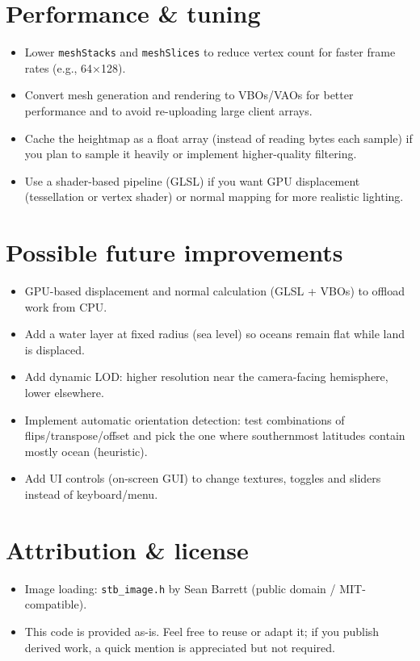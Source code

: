 \documentclass[11pt]{article}
\begin{document}
\section{Performance \& tuning}
\begin{itemize}
  \item Lower \texttt{meshStacks} and \texttt{meshSlices} to reduce vertex count for faster frame rates (e.g., 64×128).
  \item Convert mesh generation and rendering to VBOs/VAOs for better performance and to avoid re-uploading large client arrays.
  \item Cache the heightmap as a float array (instead of reading bytes each sample) if you plan to sample it heavily or implement higher-quality filtering.
  \item Use a shader-based pipeline (GLSL) if you want GPU displacement (tessellation or vertex shader) or normal mapping for more realistic lighting.
\end{itemize}

\section{Possible future improvements}
\begin{itemize}
  \item GPU-based displacement and normal calculation (GLSL + VBOs) to offload work from CPU.
  \item Add a water layer at fixed radius (sea level) so oceans remain flat while land is displaced.
  \item Add dynamic LOD: higher resolution near the camera-facing hemisphere, lower elsewhere.
  \item Implement automatic orientation detection: test combinations of flips/transpose/offset and pick the one where southernmost latitudes contain mostly ocean (heuristic).
  \item Add UI controls (on-screen GUI) to change textures, toggles and sliders instead of keyboard/menu.
\end{itemize}

\section{Attribution \& license}
\begin{itemize}
  \item Image loading: \verb|stb_image.h| by Sean Barrett (public domain / MIT-compatible).
  \item This code is provided as-is. Feel free to reuse or adapt it; if you publish derived work, a quick mention is appreciated but not required.
\end{itemize}
\end{document}
